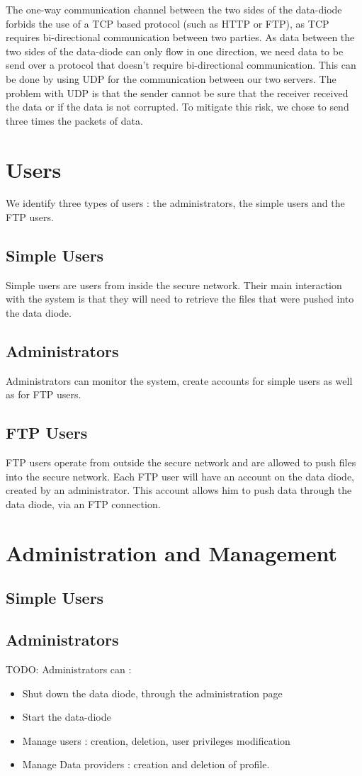 \documentclass[a4paper,11pt]{article}
\begin{document}
The one-way communication channel between the two sides of the data-diode forbids the use of a TCP based protocol (such as HTTP or FTP), as TCP requires bi-directional communication between two parties. As data between the two sides of the data-diode can only flow in one direction, we need data to be send over a protocol that doesn't require bi-directional communication. This can be done by using UDP for the communication between our two servers. The problem with UDP is that the sender cannot be sure that the receiver received the data or if the data is not corrupted. To mitigate this risk, we chose to send three times the packets of data.


\section{Users}
We identify three types of users : the administrators, the simple users and the FTP users.
\subsection{Simple Users}
Simple users are users from inside the secure network. Their main interaction with the system is that they will need to retrieve the files that were pushed into the data diode.

\subsection{Administrators}
Administrators can monitor the system, create accounts for simple users as well as for FTP users.

\subsection{FTP Users}
FTP users operate from outside the secure network and are allowed to push files into the secure network. Each FTP user will have an account on the data diode, created by an administrator. This account allows him to push data through the data diode, via an FTP connection.

\section{Administration and Management}
\subsection{Simple Users}

\subsection{Administrators}
TODO:
Administrators can :
\begin{itemize}
\item{Shut down the data diode, through the administration page}
\item{Start the data-diode}
\item{Manage users : creation, deletion, user privileges modification}
\item{Manage Data providers : creation and deletion of profile.}
\end{itemize}
\end{document}
